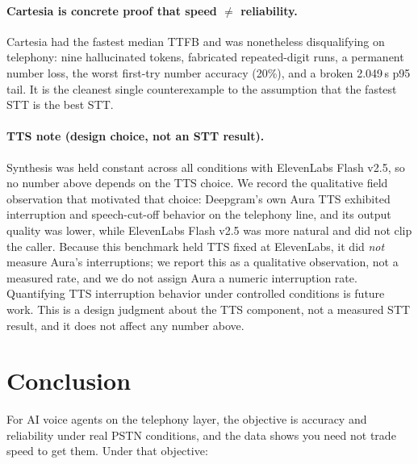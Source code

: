 \documentclass[11pt]{article}
\begin{document}
\paragraph{Cartesia is concrete proof that speed $\neq$ reliability.}
Cartesia had the fastest median TTFB and was nonetheless disqualifying on
telephony: nine hallucinated tokens, fabricated repeated-digit runs, a
permanent number loss, the worst first-try number accuracy (20\%), and a broken
2.049\,s p95 tail. It is the cleanest single counterexample to the assumption
that the fastest STT is the best STT.

\paragraph{TTS note (design choice, not an STT result).}
Synthesis was held constant across all conditions with ElevenLabs Flash v2.5, so
no number above depends on the TTS choice. We record the qualitative field
observation that motivated that choice: Deepgram's own Aura TTS exhibited
interruption and speech-cut-off behavior on the telephony line, and its output
quality was lower, while ElevenLabs Flash v2.5 was more natural and did not clip
the caller. Because this benchmark held TTS fixed at ElevenLabs, it did
\emph{not} measure Aura's interruptions; we report this as a qualitative
observation, not a measured rate, and we do not assign Aura a numeric
interruption rate. Quantifying TTS interruption behavior under controlled
conditions is future work. This is a design judgment about the TTS component,
not a measured STT result, and it does not affect any number above.

\section{Conclusion}
\label{sec:conclusion}

For AI voice agents on the telephony layer, the objective is accuracy and
reliability under real PSTN conditions, and the data shows you need not trade
speed to get them. Under that objective:
\end{document}
